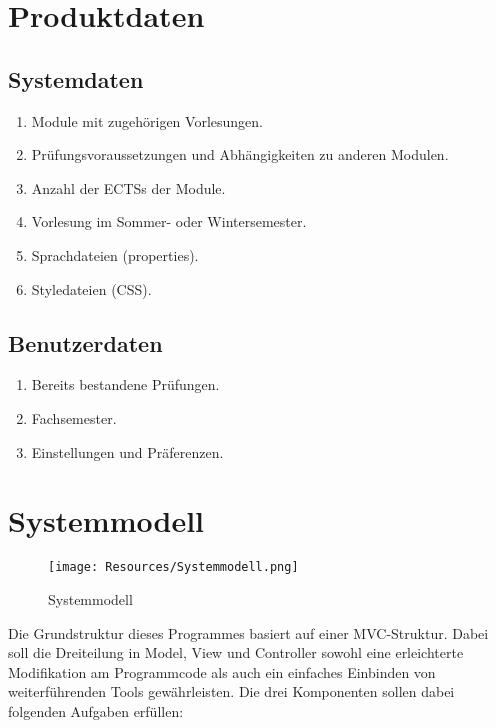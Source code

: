 \documentclass[parskip=full]{scrartcl}
\def\threedigits#1{%
	\ifnum#1<10 0\fi 
	\number#1}
\begin{document}
	\section{Produktdaten}
	
		\subsection{Systemdaten}
	
			\begin{enumerate}[label={/D\protect\threedigits{\theenumi}0/}]
				\item Module mit zugehörigen Vorlesungen.
				\item Prüfungsvoraussetzungen und Abhängigkeiten zu anderen Modulen.
				\item Anzahl der \glspl{ECTS} der Module.
				\item Vorlesung im Sommer- oder Wintersemester. 
				\item Sprachdateien (\gls{properties}).
				\item Styledateien (\gls{CSS}).
			\end{enumerate}
	
		\subsection{Benutzerdaten}
	
			\begin{enumerate}[label=/D\protect\threedigits{\theenumi}0/,resume]
				\item Bereits bestandene Prüfungen.
				\item Fachsemester.
				\item Einstellungen und Präferenzen.
			\end{enumerate}
	
	\section{Systemmodell}
	
		\begin{figure}[h]
			\centering
			\texttt{[image: Resources/Systemmodell.png]}
			\caption{Systemmodell}
			\label{fig:Systemmodell}
		\end{figure}

		Die Grundstruktur dieses Programmes basiert auf einer MVC-Struktur. Dabei soll die Dreiteilung in Model, View und Controller sowohl eine erleichterte Modifikation am Programmcode als auch ein einfaches Einbinden von weiterführenden Tools gewährleisten. Die drei Komponenten sollen dabei folgenden Aufgaben erfüllen:
		\\ \\
\end{document}
